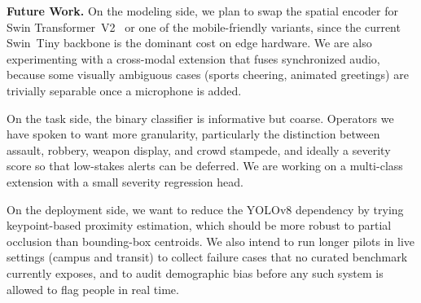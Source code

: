 \documentclass[conference]{IEEEtran}
\begin{document}
\vspace{0.15cm}
\noindent\textbf{Future Work.} On the modeling side, we plan to swap the spatial encoder for Swin Transformer~V2~\cite{liu_swin_2022} or one of the mobile-friendly variants, since the current Swin~Tiny backbone is the dominant cost on edge hardware. We are also experimenting with a cross-modal extension that fuses synchronized audio, because some visually ambiguous cases (sports cheering, animated greetings) are trivially separable once a microphone is added.

On the task side, the binary classifier is informative but coarse. Operators we have spoken to want more granularity, particularly the distinction between assault, robbery, weapon display, and crowd stampede, and ideally a severity score so that low-stakes alerts can be deferred. We are working on a multi-class extension with a small severity regression head.

On the deployment side, we want to reduce the YOLOv8 dependency by trying keypoint-based proximity estimation, which should be more robust to partial occlusion than bounding-box centroids. We also intend to run longer pilots in live settings (campus and transit) to collect failure cases that no curated benchmark currently exposes, and to audit demographic bias before any such system is allowed to flag people in real time.



\end{document}
